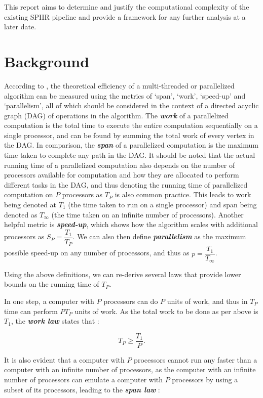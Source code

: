 \documentclass{article}
\begin{document}
This report aims to determine and justify the computational complexity of the existing SPIIR pipeline and provide a framework for any further analysis at a later date.

\section{Background} \label{sec:background}

According to \cite{CLRS}, the theoretical efficiency of a multi-threaded or parallelized algorithm can be measured using the metrics of `span', `work', `speed-up' and `parallelism', all of which should be considered in the context of a directed acyclic graph (DAG) of operations in the algorithm.
The \textit{\textbf{work}} of a parallelized computation is the total time to execute the entire computation sequentially on a single processor, and can be found by summing the total work of every vertex in the DAG.
In comparison, the \textit{\textbf{span}} of a parallelized computation is the maximum time taken to complete any path in the DAG.
It should be noted that the actual running time of a parallelized computation also depends on the number of processors available for computation and how they are allocated to perform different tasks in the DAG, and thus denoting the running time of parallelized computation on \(P\) processors as \(T_P\) is also common practice.
This leads to work being denoted at \(T_1\) (the time taken to run on a single processor) and span being denoted as \(T_\infty\) (the time taken on an infinite number of processors).
Another helpful metric is \textit{\textbf{speed-up}}, which shows how the algorithm scales with additional processors as \(S_P = \dfrac{T_1}{T_P}\).
We can also then define \textit{\textbf{parallelism}} as the maximum possible speed-up on any number of processors, and thus as \(p = \dfrac{T_1}{T_\infty}\).

Using the above definitions, we can re-derive several laws that provide lower bounds on the running time of \(T_P\).

In one step, a computer with \(P\) processors can do \(P\) units of work, and thus in \(T_P\) time can perform \(PT_P\) units of work.
As the total work to be done as per above is \(T_1\), the \textit{\textbf{work law}} states that \cite{CLRS}:

\[
    T_P \geq \dfrac{T_1}{P}.
\]

It is also evident that a computer with \(P\) processors cannot run any faster than a computer with an infinite number of processors, as the computer with an infinite number of processors can emulate a computer with \(P\) processors by using a subset of its processors, leading to the \textit{\textbf{span law}} \cite{CLRS}:
\end{document}
